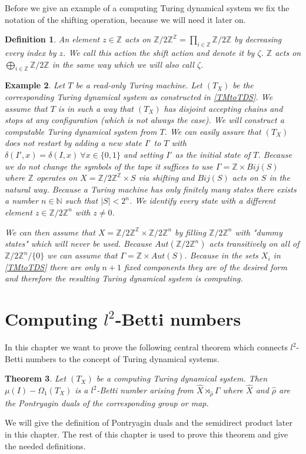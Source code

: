 \documentclass[12pt,a4paper]{scrartcl}
\newtheorem{Theorem}{Theorem}[section]
\newtheorem{Definition}[Theorem]{Definition}
\newtheorem{Example}[Theorem]{Example}
\numberwithin{equation}{section}
\newcommand{\Z}{\mathbb{Z}} %
\newcommand{\N}{\mathbb{N}} %
\newcommand{\2}{\mathbb{Z} / 2 \mathbb{Z}}
\newcommand{\1}{\bar{1}}
\newcommand{\0}{\bar{0}}
\begin{document}
Before we give an example of a computing Turing dynamical system we fix the notation of the shifting operation, because we will need it later on.
\begin{Definition} \label{shift}
	An element $z \in \Z$ acts on $\2^{\Z} = \prod_{i \in \Z} \2$ by decreasing every index by $z$. We call this action the shift action and denote it by $\zeta$. $\Z$ acts on $\bigoplus_{i \in \Z} \2$ in the same way which we will also call $\zeta$.
\end{Definition}
\begin{Example} \label{roTMtoTDS}
	Let $T$ be a read-only Turing machine. Let $(T_X)$ be the corresponding Turing dynamical system as constructed in \ref{TMtoTDS}. We assume that $T$ is in such a way that $(T_X)$ has disjoint accepting chains and stops at any configuration (which is not always the case). We will construct a computable Turing dynamical system from $T$.  We can easily assure that $(T_X)$ does not restart by adding a new state $I'$ to $T$ with $\delta(I', x) = \delta(I, x) \ \forall x \in \{0,1\}$ and setting $I'$ as the initial state of $T$. Because we do not change the symbols of the tape it suffices to use $\Gamma = \Z \times Bij(S)$ where $\Z$ operates on $X = \2^\Z \times S$ via shifting and $Bij(S)$ acts on $S$ in the natural way. Because a Turing machine has only finitely many states there exists a number $n \in \N$ such that $|S| < 2^n$. We identify every state with a different element $z \in \2^n$ with $z \neq 0$.
	
	 We can then assume that $X = \2^\Z \times \2^n$ by filling $\2^n$ with "dummy states" which will never be used. Because $Aut(\2^n)$ acts transitively on all of $\2^n / \{0\}$ we can assume that $\Gamma = \Z \times Aut(S)$. Because in the sets $X_i$ in \ref{TMtoTDS} there are only $n+1$ fixed components they are of the desired form and therefore the resulting Turing dynamical system is computing.
\end{Example}


\section{Computing $l^2$-Betti numbers}
In this chapter we want to prove the following central theorem which connects $l^2$-Betti numbers to the concept of Turing dynamical systems.
\begin{Theorem} \label{HS}
	Let $(T_X)$ be a computing Turing dynamical system. Then $\mu (I) - \Omega_1(T_X)$ is a $l^2$-Betti number arising from $\hat{X} \rtimes_{\hat{\rho}} \Gamma$ where $\hat{X}$ and $\hat{\rho}$ are the Pontryagin duals of the corresponding group or map.
\end{Theorem}
We will give the definition of Pontryagin duals and the semidirect product later in this chapter. The rest of this chapter is used to prove this theorem and give the needed definitions.
\end{document}
